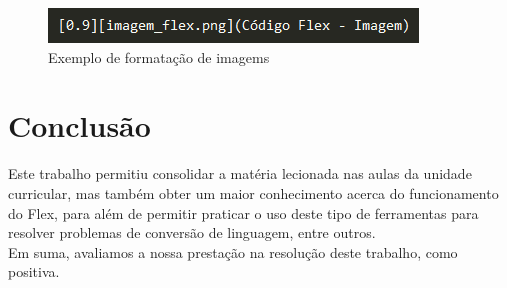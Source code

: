 \documentclass{report}
\begin{document}
\begin{figure}[h]
	\centering
	\includegraphics[scale=1]{imagem_source.png}
	\caption{Exemplo de formatação de imagems}
\end{figure}


\chapter{Conclusão
}
Este trabalho permitiu consolidar a matéria lecionada 
nas aulas da unidade curricular, mas também obter um maior 
conhecimento acerca do funcionamento do Flex, 
para além de permitir praticar o uso deste tipo de ferramentas 
para resolver problemas de conversão de linguagem, entre outros.
\\
Em suma, avaliamos a nossa prestação na resolução deste trabalho, como positiva.
\end{document}
